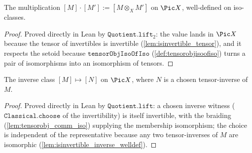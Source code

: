 \begin{definition}\leanok
  \label{def:pic_mul}
  The multiplication \([M] \cdot [M'] := [M \otimes_X M']\) on \(\Pic X\), well-defined on
  iso-classes.
\end{definition}
\begin{proof}
  \leanok
  Proved directly in Lean by \(\mathtt{Quotient.lift}_2\): the value lands in \(\Pic X\)
  because the tensor of invertibles is invertible (\cref{lem:isinvertible_tensor}), and it
  respects the setoid because \(\mathtt{tensorObjIsoOfIso}\) (\cref{def:tensorobjisoofiso})
  turns a pair of isomorphisms into an isomorphism of tensors.
\end{proof}

\begin{definition}\leanok
  \label{def:pic_inv}
  The inverse class \([M] \mapsto [N]\) on \(\Pic X\), where \(N\) is a chosen tensor-inverse
  of \(M\).
\end{definition}
\begin{proof}
  \leanok
  Proved directly in Lean by \(\mathtt{Quotient.lift}\): a chosen inverse witness
  (\(\mathtt{Classical.choose}\) of the invertibility) is itself invertible, with the
  braiding (\cref{lem:tensorobj_comm_iso}) supplying the membership isomorphism; the choice
  is independent of the representative because any two tensor-inverses of \(M\) are
  isomorphic (\cref{lem:isinvertible_inverse_welldef}).
\end{proof}
